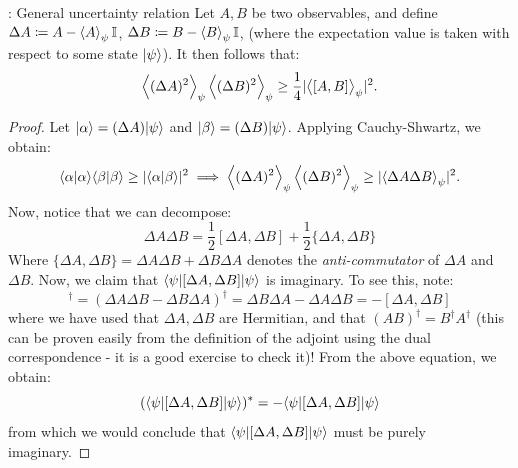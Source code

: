 \begin{thmbox}{: General uncertainty relation}
    Let $A, B$ be two observables, and define $\Delta A \coloneqq A - \left< A \right>_\psi \mathbb{I}$, $\Delta B \coloneqq B - \left< B \right>_\psi \mathbb{I}$, (where the expectation value is taken with respect to some state $\lvert \psi \rangle$). It then follows that:
    \begin{equation}
        \left< (\Delta A)^2 \right>_\psi\left< (\Delta B)^2 \right>_\psi \geq \frac{1}{4}\lvert \left< [A, B] \right>_\psi \rvert^2.
    \end{equation}
\end{thmbox}
\begin{proof}
    Let $\lvert \alpha \rangle = (\Delta A)\lvert \psi \rangle$ and $\lvert \beta \rangle = (\Delta B)\lvert \psi \rangle$. Applying Cauchy-Shwartz, we obtain:
    \begin{equation}\label{eq-CSapplied}
        \langle \alpha \lvert \alpha \rangle\langle \beta \lvert \beta \rangle \geq \lvert \langle \alpha \lvert \beta \rangle \rvert^2 \implies \left< (\Delta A)^2 \right>_\psi\left< (\Delta B)^2 \right>_\psi \geq \lvert \left< \Delta A\Delta B \right>_\psi \rvert^2.
    \end{equation}
    Now, notice that we can decompose:
    \begin{equation}
        \Delta A \Delta B = \frac{1}{2}[\Delta A, \Delta B] + \frac{1}{2}\{\Delta A, \Delta B \}
    \end{equation}
    Where $\{\Delta A, \Delta B\} = \Delta A\Delta B + \Delta B\Delta A$ denotes the \emph{anti-commutator} of $\Delta A$ and $\Delta B$. Now, we claim that $\langle \psi \rvert[\Delta A, \Delta B]\lvert \psi \rangle$ is imaginary. To see this, note:
    \begin{equation}
        [\Delta A, \Delta B]^\dag = (\Delta A \Delta B - \Delta B \Delta A)^\dag = \Delta B \Delta A - \Delta A \Delta B = -[\Delta A, \Delta B]
    \end{equation}
    where we have used that $\Delta A, \Delta B$ are Hermitian, and that $(AB)^\dag = B^\dag A^\dag$ (this can be proven easily from the definition of the adjoint using the dual correspondence - it is a good exercise to check it)! From the above equation, we obtain:
    \begin{equation}
        (\langle \psi \rvert[\Delta A, \Delta B]\lvert \psi \rangle)^* = -\langle \psi \rvert[\Delta A, \Delta B]\lvert \psi \rangle
    \end{equation}
    from which we would conclude that $\langle \psi \rvert[\Delta A, \Delta B]\lvert \psi \rangle$ must be purely imaginary. 


\end{proof}
